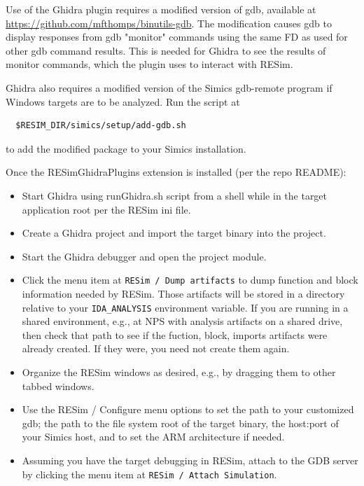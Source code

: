 \documentclass[titlepage]{article}
\begin{document}
Use of the Ghidra plugin requires a modified version of gdb, available at
\url{https://github.com/mfthomps/binutils-gdb}.  The modification causes
gdb to display responses from gdb "monitor" commands using the same FD as used
for other gdb command results.  This is needed for Ghidra to see the results of monitor commands, which the plugin
uses to interact with RESim.

Ghidra also requires a modified version of the Simics gdb-remote program if Windows targets are to be
analyzed.  Run the script at
\begin{verbatim}
  $RESIM_DIR/simics/setup/add-gdb.sh
\end{verbatim}
to add the modified package to your Simics installation.

Once the RESimGhidraPlugins extension is installed (per the repo README): 
\begin{itemize}
\item Start Ghidra using runGhidra.sh script from a shell while in the target application root 
per the RESim ini file.

\item Create a Ghidra project and import the target binary into the project.

\item Start the Ghidra debugger and open the project module.

\item Click the menu item at {\tt RESim / Dump artifacts}  to dump function and block information
needed by RESim.  Those artifacts will be stored in a directory relative to your {\tt IDA\_ANALYSIS} environment variable.
If you are running in a shared environment, e.g., at NPS with analysis artifacts on a shared drive, then 
check that path to see if the fuction, block, imports artifacts were already created.  If they were, you need not create them again.

\item Organize the RESim windows
as desired, e.g., by dragging them to other tabbed windows.

\item Use the RESim / Configure menu options to set the path to your customized gdb; the path to
the file system root of the target binary, the host:port of your Simics host, and to set the ARM architecture if needed.

\item Assuming you have the target debugging in RESim, attach to the GDB server by clicking the menu item at {\tt RESim / Attach Simulation}.


\end{itemize}
\end{document}
